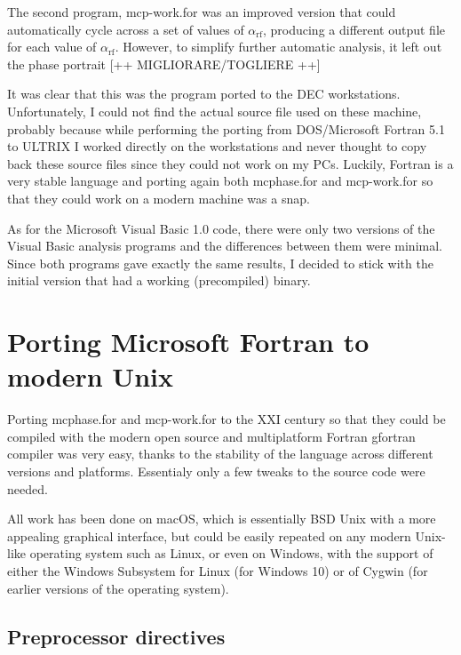 The second program, \textsf{mcp-work.for} was an improved version that could automatically cycle across a  set of values of $\alpha_\mathrm{rf}$, producing a different output file for each value of $\alpha_\mathrm{rf}$. However, to simplify further automatic analysis, it left out the phase portrait [++ MIGLIORARE/TOGLIERE ++]

It was clear that this was the program ported to the DEC workstations. 
Unfortunately, I could not find the actual source file used on these machine, probably because while performing the porting from DOS/Microsoft Fortran 5.1 to ULTRIX I worked directly on the workstations and never thought to copy back these source files since they could not work on my PCs.
Luckily, Fortran is a very stable language and porting again both \textsf{mcphase.for} and \textsf{mcp-work.for} so that they could work on a modern machine was a snap.

As for the Microsoft Visual Basic 1.0 code, there were only two versions of the Visual Basic analysis programs and the differences between them were minimal. Since both programs gave exactly the same results, I decided to stick with the initial version that had a working (precompiled) binary.



\section{Porting Microsoft Fortran to modern Unix}

Porting \textsf{mcphase.for} and \textsf{mcp-work.for} to the XXI century so that they could be compiled with the modern open source and multiplatform Fortran \textsf{gfortran} compiler was very easy, thanks to the stability of the language across different versions and platforms. Essentialy only a few tweaks to the source code were needed.

All work has been done on macOS, which is essentially BSD Unix with a more appealing graphical interface, but could be easily repeated on any modern Unix-like operating system such as Linux, or even on Windows, with the support of either the Windows Subsystem for Linux (for Windows 10) or of Cygwin (for earlier versions of the operating system).



\subsection{Preprocessor directives}

